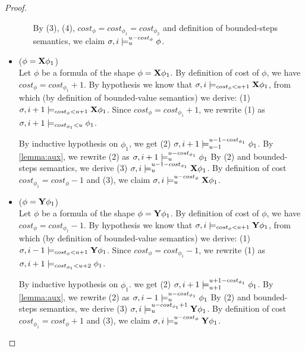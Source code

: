 \begin{theorem}
\begin{lemma}
\begin{proof}
\begin{itemize}
\begin{itemize}
        By (3), (4), $cost_\phi = cost_{\phi_1} = cost_{\phi_2}$ and definition of bounded-steps semantics, we claim $\sigma,i \models_{u}^{u-cost_\phi} \phi$.
    \end{itemize}

    \item ($\phi = \mathbf{X} \phi_1$) \\
    Let $\phi$ be a formula of the shape $\phi = \mathbf{X} \phi_1$.
    By definition of cost of $\phi$, we have $cost_\phi = cost_{\phi_1} + 1$.
    By hypothesis we know that $\sigma,i \models_{cost_\phi < u + 1} \mathbf{X} \phi_1$, from which (by definition of bounded-value semantics) we derive: (1) $\sigma,i+1 \models_{cost_\phi < u + 1} \mathbf{X} \phi_1$.
    Since $cost_\phi = cost_{\phi_1} + 1$, we rewrite (1) as $\sigma,i+1 \models_{cost_{\phi_1} < u} \phi_1$.

    By inductive hypothesis on $\phi_1$, we get (2) $\sigma,i+1 \models_{u-1}^{u-1-cost_{\phi_1}} \phi_1$.
    By \autoref{lemma:aux}, we rewrite (2) as $\sigma,i+1 \models_{u}^{u-cost_{\phi_1}} \phi_1$
    By (2) and bounded-steps semantics, we derive (3) $\sigma,i \models_{u}^{u-1-cost_{\phi_1}} \mathbf{X} \phi_1$.
    By definition of cost $cost_{\phi_1} = cost_\phi - 1$ and (3), we claim $\sigma,i \models_{u}^{u-cost_\phi} \mathbf{X} \phi_1$.

    \item ($\phi = \mathbf{Y} \phi_1$) \\
    Let $\phi$ be a formula of the shape $\phi = \mathbf{Y} \phi_1$.
    By definition of cost of $\phi$, we have $cost_\phi = cost_{\phi_1} - 1$.
    By hypothesis we know that $\sigma,i \models_{cost_\phi < u + 1} \mathbf{Y} \phi_1$, from which (by definition of bounded-value semantics) we derive: (1) $\sigma,i-1 \models_{cost_\phi < u + 1} \mathbf{Y} \phi_1$.
    Since $cost_\phi = cost_{\phi_1} - 1$, we rewrite (1) as $\sigma,i+1 \models_{cost_{\phi_1} < u+2} \phi_1$.

    By inductive hypothesis on $\phi_1$. we get (2) $\sigma,i+1 \models_{u+1}^{u+1-cost_{\phi_1}} \phi_1$.
    By \autoref{lemma:aux}, we rewrite (2) as $\sigma,i-1 \models_{u}^{u-cost_{\phi_1}} \phi_1$
    By (2) and bounded-steps semantics, we derive (3) $\sigma,i \models_{u}^{u-cost_{\phi_1}+1} \mathbf{Y} \phi_1$.
    By definition of cost $cost_{\phi_1} = cost_\phi + 1$ and (3), we claim $\sigma,i \models_{u}^{u-cost_\phi} \mathbf{Y} \phi_1$.


\end{itemize}
\end{proof}
\end{lemma}
\end{theorem}
